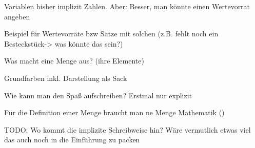 \documentclass[../../main.tex]{subfiles}
\begin{document}
Variablen bisher implizit Zahlen. Aber: Besser, man könnte einen Wertevorrat angeben

\begin{example}{}
    Beispiel für Wertevorräte bzw Sätze mit solchen (z.B. fehlt noch ein Besteckstück-> was könnte das sein?)
\end{example}

Was macht eine Menge aus? (ihre Elemente)

\begin{example}{}
    Grundfarben inkl. Darstellung als Sack
\end{example}

Wie kann man den Spaß aufschreiben? Erstmal nur explizit

\begin{definition}{}
    Für die Definition einer Menge braucht man ne Menge Mathematik ()
\end{definition}

TODO: Wo kommt die implizite Schreibweise hin? Wäre vermutlich etwas viel das auch noch in die Einführung zu packen
\end{document}
